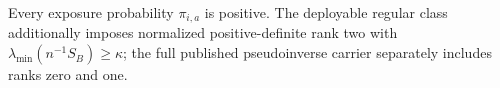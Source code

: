 Every exposure probability \(\pi_{i,a}\) is positive.  The deployable regular class additionally imposes normalized positive-definite rank two with \(\lambda_{\min}(n^{-1}S_B)\ge\kappa\); the full published pseudoinverse carrier separately includes ranks zero and one.